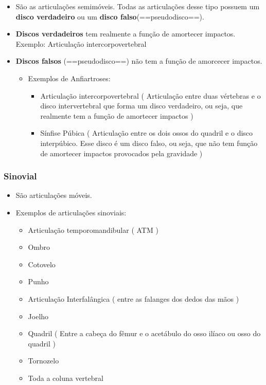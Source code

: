 \documentclass[
]{book}
\providecommand{\tightlist}{%
  \setlength{\itemsep}{0pt}\setlength{\parskip}{0pt}}
\begin{document}
\begin{itemize}
\item
  São as articulações semimóveis. Todas as articulações desse tipo possuem um \textbf{disco verdadeiro} ou um \textbf{disco falso}(==pseudodisco==).
\item
  \textbf{Discos verdadeiros} tem realmente a função de amortecer impactos. Exemplo: Articulação intercorpovertebral
\item
  \textbf{Discos falsos} (==pseudodisco==) não tem a função de amorcecer impactos.

  \begin{itemize}
  \tightlist
  \item
    Exemplos de Anfiartroses:

    \begin{itemize}
    \tightlist
    \item
      Articulação intercorpovertebral ( Articulação entre duas vértebras e o disco intervertebral que forma um disco verdadeiro, ou seja, que realmente tem a função de amortecer impactos )
    \item
      Sínfise Púbica ( Articulação entre os dois ossos do quadril e o disco interpúbico. Esse disco é um disco falso, ou seja, que não tem função de amortecer impactos provocados pela gravidade )
    \end{itemize}
  \end{itemize}
\end{itemize}

\hypertarget{sinovial}{%
\subsubsection{Sinovial}\label{sinovial}}

\begin{itemize}
\item
  São articulações móveis.
\item
  Exemplos de articulações sinoviais:

  \begin{itemize}
  \tightlist
  \item
    Articulação temporomandibular ( ATM )
  \item
    Ombro
  \item
    Cotovelo
  \item
    Punho
  \item
    Articulação Interfalângica ( entre as falanges dos dedos das mãos )
  \item
    Joelho
  \item
    Quadril ( Entre a cabeça do fêmur e o acetábulo do osso ilíaco ou osso do quadril )
  \item
    Tornozelo
  \item
    Toda a coluna vertebral
  \end{itemize}
\end{itemize}
\end{document}
